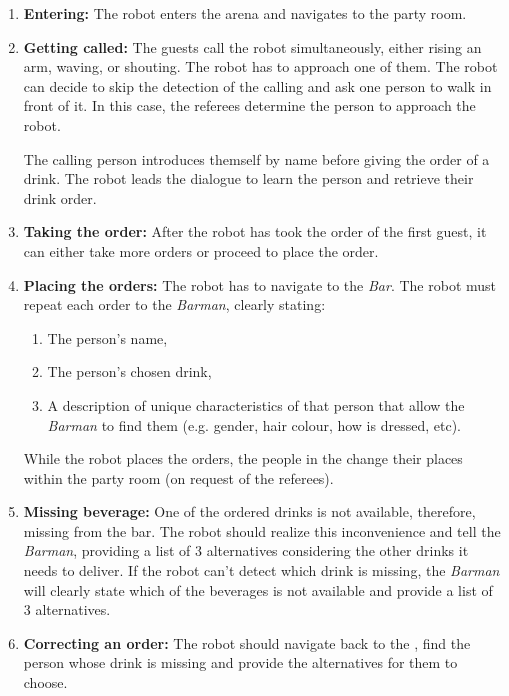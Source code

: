 \begin{enumerate}

	\item \textbf{Entering:} The robot enters the arena and navigates to the party room.

	\item \textbf{Getting called:} The guests call the robot simultaneously, either rising an arm, waving, or shouting.
	The robot has to approach one of them.
        The robot can decide to skip the detection of the calling and ask one person to walk in front of it. In this case, the referees determine the person to approach the robot.


	The calling person introduces themself by name before giving the order of a drink.
	The robot leads the dialogue to learn the person and retrieve their drink order. \\


	\item \textbf{Taking the order:} After the robot has took the order of the first guest, it can either take more orders or proceed to place the order.

	\item \textbf{Placing the orders:} The robot has to navigate to the \textit{Bar}. The robot must repeat each order to the \textit{Barman}, clearly stating:
	\begin{enumerate}
		\item The person's name,
		\item The person's chosen drink,
		\item A description of unique characteristics of that person that allow the \textit{Barman} to find them (e.g. gender, hair colour, how is dressed, etc).
	\end{enumerate}

	While the robot places the orders, the people in the  change their places within the party room (on request of the referees).

	\item \textbf{Missing beverage:} One of the ordered drinks is not available, therefore, missing from the bar.
	The robot should realize this inconvenience and tell the \textit{Barman}, providing a list of 3 alternatives considering the other drinks it needs to deliver.
	If the robot can't detect which drink is missing, the \textit{Barman} will clearly state which of the beverages is not available and provide a list of 3 alternatives.

	\item \textbf{Correcting an order:} The robot should navigate back to the , find the person whose drink is missing and provide the alternatives for them to choose.\\


\end{enumerate}
